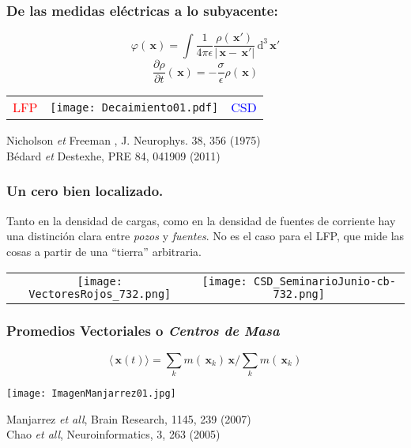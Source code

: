 \documentclass{beamer}
\newcommand{\dd}{\, \mathrm{d}}
\newcommand{\xq}{\, \mathbf{x}}
\begin{document}
\begin{frame}
  \frametitle{De las medidas eléctricas a lo subyacente:} 
  \begin{equation}
    \varphi(\xq)
    =\int \frac{1}{4\pi\epsilon}
    \frac{\rho(\xq')}{|\xq-\xq'|} \dd^3 \xq'  
  \end{equation}
    \begin{equation}
      \frac{\partial \rho}{\partial{t}}(\xq)=
      -\frac{\sigma}{\epsilon}\rho(\xq)
    \end{equation}
  \begin{center}
  \begin{tabular}{ccc}
   \textcolor{red}{LFP} & 
   \texttt{[image: Decaimiento01.pdf]} &
   \textcolor{blue}{CSD}
  \end{tabular}
  \end{center}
  {\tiny Nicholson \emph{et} Freeman , J.   Neurophys. 38, 356 (1975)\\
         Bédard \emph{et} Destexhe, PRE 84, 041909 (2011) }
\end{frame}





\begin{frame}
\frametitle{Un cero bien localizado.} 
Tanto en la densidad de cargas, como en la densidad de fuentes de corriente
hay una distinción clara entre \emph{pozos} y \emph{fuentes}.
No es el caso para el LFP, que mide las cosas a partir de una ``tierra''
arbitraria.

\begin{tabular}{cc}
      \texttt{[image: VectoresRojos\_732.png]} &
    \texttt{[image: CSD\_SeminarioJunio-cb-732.png]} 
\end{tabular}
\end{frame}


\begin{frame}
  \frametitle{Promedios Vectoriales o \emph{Centros de Masa}}
  \begin{equation}
    \langle \xq(t) \rangle=\sum_k m(\xq_k)\xq/\sum_k m(\xq_k)
  \end{equation}
  
  \begin{center}
    \texttt{[image: ImagenManjarrez01.jpg]}
  \end{center} 
  
 \begin{flushright}
  {\tiny  Manjarrez \emph{ et all}, Brain Research, 1145, 239 (2007) \\
      Chao \emph{ et all}, Neuroinformatics, 3, 263 (2005) }
  \end{flushright}

\end{frame}
\end{document}
